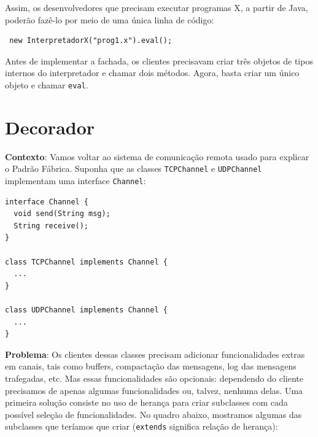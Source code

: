 \documentclass[
  11pt,
  twoside]{book}
\newcommand{\passthrough}[1]{#1}
\begin{document}
Assim, os desenvolvedores que precisam executar programas X, a partir de
Java, poderão fazê-lo por meio de uma única linha de código:

\begin{lstlisting}
 new InterpretadorX("prog1.x").eval();
\end{lstlisting}

Antes de implementar a fachada, os clientes precisavam criar três
objetos de tipos internos do interpretador e chamar dois métodos. Agora,
basta criar um único objeto e chamar \passthrough{\lstinline!eval!}.

\hypertarget{decorador}{%
\section{Decorador}\label{decorador}}

 

\textbf{Contexto}: Vamos voltar ao sistema de comunicação remota usado
para explicar o Padrão Fábrica. Suponha que as classes
\passthrough{\lstinline!TCPChannel!} e
\passthrough{\lstinline!UDPChannel!} implementam uma interface
\passthrough{\lstinline!Channel!}:

\begin{lstlisting}
interface Channel {
  void send(String msg);
  String receive();
}

class TCPChannel implements Channel {
  ...
}

class UDPChannel implements Channel {
  ...
}
\end{lstlisting}

\textbf{Problema}: Os clientes dessas classes precisam adicionar
funcionalidades extras em canais, tais como buffers, compactação das
mensagens, log das mensagens trafegadas, etc. Mas essas funcionalidades
são opcionais: dependendo do cliente precisamos de apenas algumas
funcionalidades ou, talvez, nenhuma delas. Uma primeira solução consiste
no uso de herança para criar subclasses com cada possível seleção de
funcionalidades. No quadro abaixo, mostramos algumas das subclasses que
teríamos que criar (\passthrough{\lstinline!extends!} significa relação
de herança):
\end{document}
